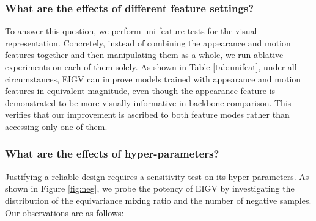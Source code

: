 

\subsubsection{\textbf{What are the effects of different feature settings?}}
To answer this question, we perform uni-feature tests for the visual representation. Concretely, instead of combining the appearance and motion features together and then manipulating them as a whole, we run ablative experiments on each of them solely.  
%
As shown in Table \ref{tab:unifeat}, under all circumstances, EIGV can improve models trained with appearance and motion features in equivalent magnitude, even though the appearance feature is demonstrated to be more visually informative in backbone comparison. This verifies that our improvement is ascribed to both feature modes rather than accessing only one of them.




\subsubsection{\textbf{What are the effects of hyper-parameters?}}
Justifying a reliable design requires a sensitivity test on its hyper-parameters. As shown in Figure \ref{fig:neg}, we probe the potency of EIGV by investigating the distribution of the equivariance mixing ratio and the number of negative samples. Our observations are as follows:

